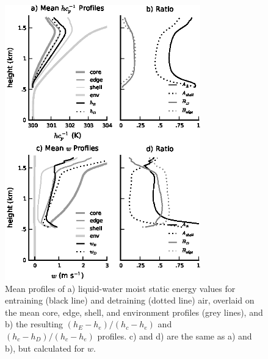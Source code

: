 \documentclass[draft,grl]{agutex}
\begin{document}
\begin{figure}
  \noindent\includegraphics[width=20pc]{./figures/profile_plots}
  \caption{Mean profiles of a) liquid-water moist static energy values for 
  entraining (black line) and detraining (dotted line) air, overlaid on the 
  mean core, edge, shell, and environment profiles (grey lines), and b) the 
  resulting $(h_E - h_e)/(h_c - h_e)$ and $(h_c - h_D)/(h_c - h_e)$ profiles.  
  c) and d) are the same as a) and b), but calculated for $w$. 
}
  \label{fig:profile_plots}
\end{figure}
\end{document}
